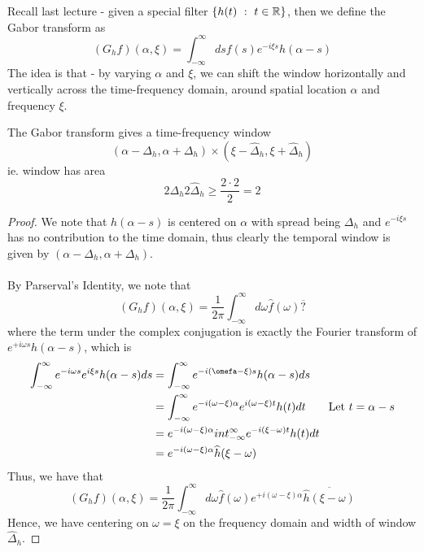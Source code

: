 \documentclass{article}
\begin{document}
Recall last lecture - given a special filter $\{h(t)\ :\ t \in \mathbb{R}\}$, then we define the Gabor transform as
\[(G_h f)(\alpha, \xi) = \int_{-\infty}^\infty ds f(s) e^{-i\xi s} h(\alpha - s)\]
The idea is that - by varying $\alpha$ and $\xi$, we can shift the window horizontally and vertically across the time-frequency domain, around spatial location $\alpha$ and frequency $\xi$.

\begin{proposition}
    The Gabor transform gives a time-frequency window
    \[(\alpha - \Delta_h, \alpha + \Delta_h) \times (\xi - \widehat{\Delta}_h, \xi + \widehat{\Delta}_h)\]
    ie. window has area
    \[2 \Delta_h 2 \widehat{\Delta}_h \geq \frac{2 \cdot 2}{2} = 2\]
\end{proposition}

\begin{proof}
    We note that $h(\alpha - s)$ is centered on $\alpha$ with spread being $\Delta_h$ and $e^{-i\xi s}$ has no contribution to the time domain, thus clearly the temporal window is given by $(\alpha - \Delta_h, \alpha + \Delta_h)$.\\\\
    By Parserval's Identity, we note that
    \[(G_h f)(\alpha, \xi) = \frac{1}{2\pi} \int_{-\infty}^\infty d\omega \widehat{f}(\omega) \overline{?}\]
    where the term under the complex conjugation is exactly the Fourier transform of $e^{+i \omega s} h(\alpha - s)$, which is
    \begin{align*}
        \int_{-\infty}^\infty e^{-i\omega s} e^{i \xi s} h(\alpha - s) ds &= \int_{-\infty}^\infty e^{-i(\omefa - \xi)s} h(\alpha - s) ds\\
        &= \int_{-\infty}^\infty e^{-i(\omega - \xi)\alpha} e^{i(\omega - \xi)t} h(t) dt \tag*{Let $t = \alpha - s$}\\
        &= e^{-i(\omega - \xi)\alpha} int_{-\infty}^\infty e^{-i(\xi - \omega)t} h(t) dt\\
        &= e^{-i(\omega - \xi)\alpha} \widehat{h}(\xi - \omega)
    \end{align*}
    Thus, we have that
        \[(G_h f)(\alpha, \xi) = \frac{1}{2\pi} \int_{-\infty}^\infty d\omega \widehat{f}(\omega) e^{+i(\omega - \xi)\alpha} \overline{\widehat{h}(\xi - \omega)}\]
        Hence, we have centering on $\omega = \xi$ on the frequency domain and width of window $\widehat{\Delta}_h$.
\end{proof}
\end{document}
